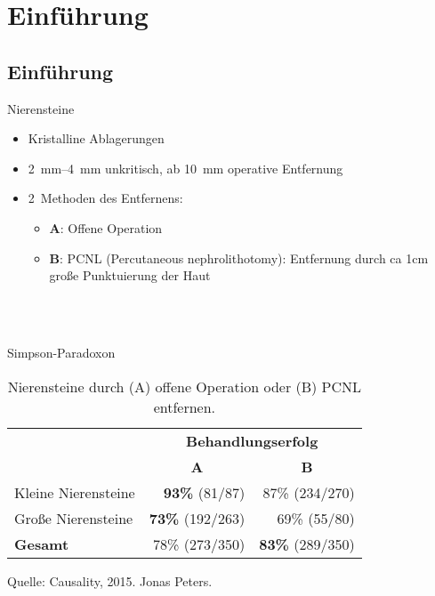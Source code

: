 \section{Einführung}
\subsection{Einführung}
\begin{frame}{Nierensteine}
    \begin{itemize}
        \item Kristalline Ablagerungen
        \item \SIrange{2}{4}{\milli\meter} unkritisch,
              ab \SI{10}{\milli\meter} operative Entfernung
        \item 2~Methoden des Entfernens:
        \begin{itemize}
            \item \textbf{A}: Offene Operation
            \item \textbf{B}: PCNL (Percutaneous nephrolithotomy): Entfernung
                  durch ca 1cm große Punktuierung der Haut
        \end{itemize}
    \end{itemize}

    \\
    \\
\end{frame}


\begin{frame}{Simpson-Paradoxon}
    \begin{table}
        \begin{tabular}{lrr}
        \toprule
        ~      & \multicolumn{2}{c}{\textbf{Behandlungserfolg}}  \\
        \cmidrule{2-3}
        ~                   & \multicolumn{1}{c}{\textbf{A}} & \multicolumn{1}{c}{\textbf{B}} \\ \midrule
        Kleine Nierensteine & \textbf{93\%}  (\hphantom{0}81/\hphantom{0}87)  & 87\% (234/270) \\
        Große Nierensteine  & \textbf{73\%} (192/263) & 69\% (\hphantom{0}55/\hphantom{0}80)\\
        \textbf{Gesamt}     & 78\% (273/350)          & \textbf{83\%} (289/350) \\
        \bottomrule
        \end{tabular}
        \caption{Nierensteine durch (A) offene Operation oder (B) PCNL entfernen.}
        \label{table:countries}
    \end{table}

    Quelle: Causality, 2015. Jonas Peters.
\end{frame}

